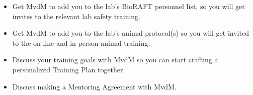 \documentclass{tufte-book}
\begin{document}
\begin{itemize}
\item{Get MvdM to add you to the lab's BioRAFT personnel list, so you
  will get invites to the relevant lab safety training.}
\item{Get MvdM to add you to the lab's animal protocol(s) so you will
  get invited to the on-line and in-person animal training.}
\item{Discuss your training goals with MvdM so you can start crafting
  a personalized Training Plan together.}
\item{Discuss making a Mentoring Agreement with MvdM.}
\end{itemize}

\backmatter





\printindex
\end{document}
